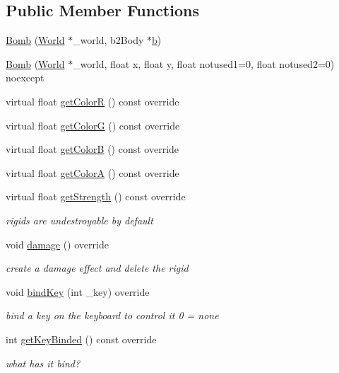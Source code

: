 \subsection*{Public Member Functions}
\begin{DoxyCompactItemize}
\item 
\hyperlink{classBomb_a99f489e0cc76550410a9cc59aff6a22e}{Bomb} (\hyperlink{classWorld}{World} $\ast$\+\_\+world, b2\+Body $\ast$\hyperlink{image_8h_ab2d05693952610f937e5acb3c4a8fa1b}{b})
\item 
\hyperlink{classBomb_a0f6e7d6049ed0415cdd2ae811592555e}{Bomb} (\hyperlink{classWorld}{World} $\ast$\+\_\+world, float x, float y, float notused1=0, float notused2=0) noexcept
\item 
virtual float \hyperlink{classBomb_aa95b13c06660f7eaee26dbb75cda41ed}{get\+Color\+R} () const override
\item 
virtual float \hyperlink{classBomb_a393fa1faa9cfdadb0d0202983de6e16b}{get\+Color\+G} () const override
\item 
virtual float \hyperlink{classBomb_a31ede414b7c9c3ef82ea201975d7fd25}{get\+Color\+B} () const override
\item 
virtual float \hyperlink{classBomb_a19e85b4632b547de51bde57844065efa}{get\+Color\+A} () const override
\item 
virtual float \hyperlink{classBomb_a6b09b40f7fb92d9145da7c1c1fe087cb}{get\+Strength} () const override
\begin{DoxyCompactList}\small\item\em rigids are undestroyable by default \end{DoxyCompactList}\item 
void \hyperlink{classBomb_a2bbbb0e9a6972b8276ec19ccac4daa7c}{damage} () override
\begin{DoxyCompactList}\small\item\em create a damage effect and delete the rigid \end{DoxyCompactList}\item 
void \hyperlink{classBomb_a68b2be434320ab67f9000e545b3dcfcd}{bind\+Key} (int \+\_\+key) override
\begin{DoxyCompactList}\small\item\em bind a key on the keyboard to control it 0 = none \end{DoxyCompactList}\item 
int \hyperlink{classBomb_a3e7950bb3de74e07e738a7f94b92a860}{get\+Key\+Binded} () const override
\begin{DoxyCompactList}\small\item\em what has it bind? \end{DoxyCompactList}\item 

\end{DoxyCompactItemize}
